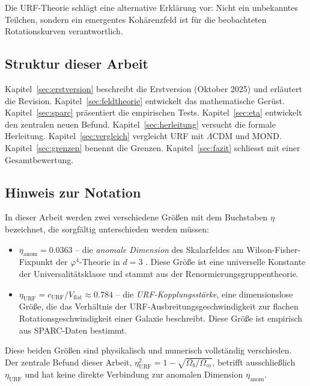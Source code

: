 \documentclass[12pt,a4paper]{article}
\theoremstyle{definition}
\begin{document}
Die URF-Theorie schlägt eine alternative Erklärung vor: Nicht ein
unbekanntes Teilchen, sondern ein emergentes Kohärenzfeld ist für die
beobachteten Rotationskurven verantwortlich.

\subsection{Struktur dieser Arbeit}

Kapitel~\ref{sec:erstversion} beschreibt die Erstversion (Oktober 2025)
und erläutert die Revision. Kapitel~\ref{sec:feldtheorie} entwickelt das
mathematische Gerüst. Kapitel~\ref{sec:sparc} präsentiert die empirischen
Tests. Kapitel~\ref{sec:eta} entwickelt den zentralen neuen Befund.
Kapitel~\ref{sec:herleitung} versucht die formale Herleitung.
Kapitel~\ref{sec:vergleich} vergleicht URF mit $\Lambda$CDM und MOND.
Kapitel~\ref{sec:grenzen} benennt die Grenzen. Kapitel~\ref{sec:fazit}
schliesst mit einer Gesamtbewertung.

\subsection*{Hinweis zur Notation}

In dieser Arbeit werden zwei verschiedene Größen mit dem
Buchstaben $\eta$ bezeichnet, die sorgfältig unterschieden
werden müssen:

\begin{itemize}
  \item $\eta_{\mathrm{anom}} = 0.0363$ -- die \emph{anomale Dimension}
        des Skalarfeldes am Wilson-Fisher-Fixpunkt der
        $\varphi^4$-Theorie in $d=3$ \cite{Pelissetto2002}.
        Diese Größe ist eine universelle Konstante der
        Universalitätsklasse und stammt aus der
        Renormierungsgruppentheorie.

  \item $\eta_{\mathrm{URF}} = c_{\mathrm{URF}}/V_{\mathrm{flat}}
        \approx 0.784$ -- die \emph{URF-Kopplungsstärke},
        eine dimensionslose Größe, die das Verhältnis der
        URF-Ausbreitungsgeschwindigkeit zur flachen
        Rotationsgeschwindigkeit einer Galaxie beschreibt.
        Diese Größe ist empirisch aus SPARC-Daten bestimmt.
\end{itemize}

Diese beiden Größen sind physikalisch und numerisch vollständig
verschieden. Der zentrale Befund dieser Arbeit,
$\eta_{\mathrm{URF}}^2 = 1 - \sqrt{\Omega_b/\Omega_m}$,
betrifft ausschließlich $\eta_{\mathrm{URF}}$ und hat keine
direkte Verbindung zur anomalen Dimension $\eta_{\mathrm{anom}}$.
\end{document}
